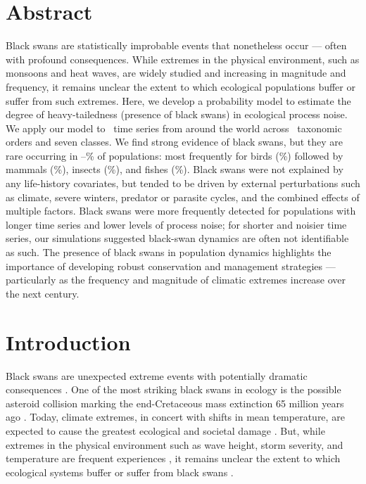 
\section{Abstract}

Black swans are statistically improbable events that nonetheless occur --- often with profound consequences. While extremes in the physical environment, such as monsoons and heat waves, are widely studied and increasing in magnitude and frequency, it remains unclear the extent to which ecological populations buffer or suffer from such extremes. Here, we develop a probability model to estimate the degree of heavy-tailedness (presence of black swans) in ecological process noise. We apply our model to \NPops~time series from around the world across \NOrders~taxonomic orders and seven classes. We find strong evidence of black swans, but they are rare occurring in \overallMinPerc--\overallMaxPerc\% of populations: most frequently for birds (\AvesRangePerc\%) followed by mammals (\MammaliaRangePerc\%), insects (\InsectaRangePerc\%), and fishes (\OsteichthyesRangePerc\%). Black swans were not explained by any life-history covariates, but tended to be driven by external perturbations such as climate, severe winters, predator or parasite cycles, and the combined effects of multiple factors. Black swans were more frequently detected for populations with longer time series and lower levels of process noise; for shorter and noisier time series, our simulations suggested black-swan dynamics are often not identifiable as such. The presence of black swans in population dynamics highlights the importance of developing robust conservation and management strategies --- particularly as the frequency and magnitude of climatic extremes increase over the next century.

\section{Introduction}

Black swans are unexpected extreme events with potentially dramatic consequences \citep{taleb2007,sornette2009}. One of the most striking black swans in ecology is the possible asteroid collision marking the end-Cretaceous mass extinction 65 million years ago \citep{alvarez1980,harnik2012}. Today, climate extremes, in concert with shifts in mean temperature, are expected to cause the greatest ecological and societal damage \citep{ipcc2012}. But, while extremes in the physical environment such as wave height, storm severity, and temperature are frequent experiences \citep{gaines1993,katz2005}, it remains unclear the extent to which ecological systems buffer or suffer from black swans \citep{nunez2012}.

